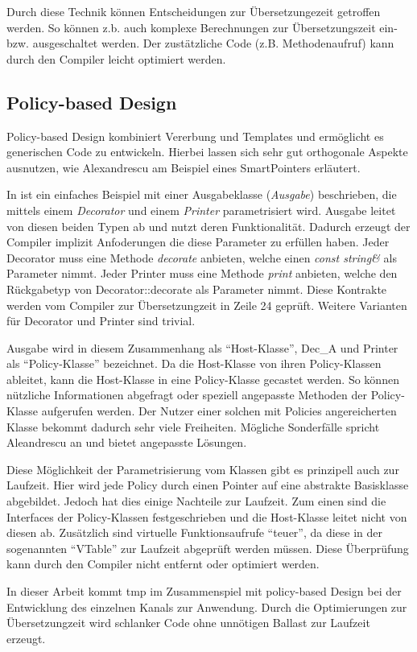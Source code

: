 

Durch diese Technik können Entscheidungen zur Übersetzungezeit getroffen werden. So können z.b. auch komplexe Berechnungen zur Übersetzungszeit ein- bzw. ausgeschaltet werden. Der zustätzliche Code (z.B. Methodenaufruf) kann durch den Compiler leicht optimiert werden.

\subsection{Policy-based Design}
Policy-based Design kombiniert Vererbung und Templates und ermöglicht es generischen Code zu entwickeln. Hierbei lassen sich sehr gut orthogonale Aspekte ausnutzen, wie Alexandrescu am Beispiel eines SmartPointers erläutert.

In  ist ein einfaches Beispiel mit einer Ausgabeklasse (\emph{Ausgabe}) beschrieben, die mittels einem \emph{Decorator} und einem \emph{Printer} parametrisiert wird. Ausgabe leitet von diesen beiden Typen ab und nutzt deren Funktionalität. Dadurch erzeugt der Compiler implizit Anfoderungen die diese Parameter zu erfüllen haben. Jeder Decorator muss eine Methode \emph{decorate} anbieten, welche einen \emph{const string\&} als Parameter nimmt. Jeder Printer muss eine Methode \emph{print} anbieten, welche den Rückgabetyp von Decorator::decorate als Parameter nimmt. Diese Kontrakte werden vom Compiler zur Übersetzungzeit in Zeile 24 geprüft. Weitere Varianten für Decorator und Printer sind trivial.

Ausgabe wird in diesem Zusammenhang als ``Host-Klasse'', Dec\_A und Printer als ``Policy-Klasse'' bezeichnet. Da die Host-Klasse von ihren Policy-Klassen ableitet, kann die Host-Klasse in eine Policy-Klasse gecastet werden. So können nützliche Informationen abgefragt oder speziell angepasste Methoden der Policy-Klasse aufgerufen werden. Der Nutzer einer solchen mit Policies angereicherten Klasse bekommt dadurch sehr viele Freiheiten. Mögliche Sonderfälle spricht Aleandrescu an und bietet angepasste Lösungen.



Diese Möglichkeit der Parametrisierung vom Klassen gibt es prinzipell auch zur Laufzeit. Hier wird jede Policy durch einen Pointer auf eine abstrakte Basisklasse abgebildet. Jedoch hat dies einige Nachteile zur Laufzeit. Zum einen sind die Interfaces der Policy-Klassen festgeschrieben und die Host-Klasse leitet nicht von diesen ab. Zusätzlich sind virtuelle Funktionsaufrufe ``teuer'', da diese in der sogenannten ``VTable'' zur Laufzeit abgeprüft werden müssen. Diese Überprüfung kann durch den Compiler nicht entfernt oder optimiert werden. 


In dieser Arbeit kommt \ac{tmp} im Zusammenspiel mit policy-based Design bei der Entwicklung des einzelnen Kanals zur Anwendung. Durch die Optimierungen zur Übersetzungzeit wird schlanker Code ohne unnötigen Ballast zur Laufzeit erzeugt.
